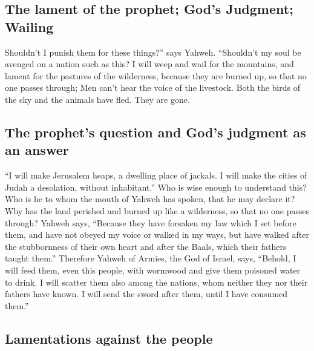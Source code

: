 \begin{paracol}{2}
\begin{otherlanguage}{english}
{\subsection{The lament of the prophet; God's Judgment;
Wailing}\label{the-lament-of-the-prophet-gods-judgment-wailing}}

 Shouldn't I punish them for these things?'' says Yahweh.
``Shouldn't my soul be avenged on a nation such as this? 
I will weep and wail for the mountains, and lament for the pastures of
the wilderness, because they are burned up, so that no one passes
through; Men can't hear the voice of the livestock. Both the birds of
the sky and the animals have fled. They are gone.

\hypertarget{the-prophets-question-and-gods-judgment-as-an-answer}{%
\subsection{The prophet's question and God's judgment as an
answer}\label{the-prophets-question-and-gods-judgment-as-an-answer}}

 ``I will make Jerusalem heaps, a dwelling place of
jackals. I will make the cities of Judah a desolation, without
inhabitant.''  Who is wise enough to understand this? Who
is he to whom the mouth of Yahweh has spoken, that he may declare it?
Why has the land perished and burned up like a wilderness, so that no
one passes through?  Yahweh says, ``Because they have
forsaken my law which I set before them, and have not obeyed my voice or
walked in my ways,  but have walked after the
stubbornness of their own heart and after the Baals, which their fathers
taught them.''  Therefore Yahweh of Armies, the God of
Israel, says, ``Behold, I will feed them, even this people, with
wormwood and give them poisoned water to drink.  I will
scatter them also among the nations, whom neither they nor their fathers
have known. I will send the sword after them, until I have consumed
them.''

\hypertarget{lamentations-against-the-people}{%
\subsection{Lamentations against the
people}\label{lamentations-against-the-people}}


\end{otherlanguage}
\end{paracol}
